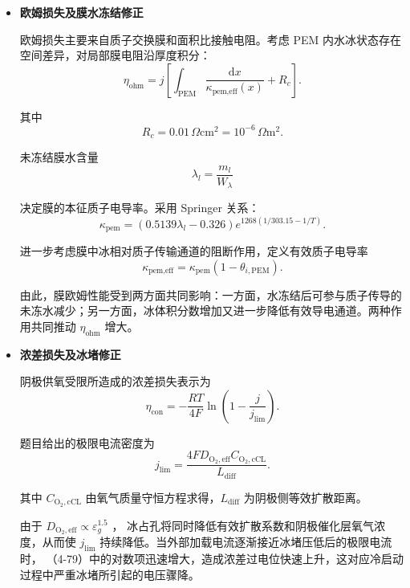 \documentclass[bwprint]{gmcmthesis}
\numberwithin{figure}{section}
\begin{document}
\begin{itemize}
\item \textbf {欧姆损失及膜水冻结修正}

 欧姆损失主要来自质子交换膜和面积比接触电阻。考虑 PEM 内水冰状态存在空间差异，对局部膜电阻沿厚度积分：
\begin{equation}
\eta_{\text{ohm}} = j \left[ \int_{\text{PEM}} \frac{\mathrm{d}x}{\kappa_{\text{pem,eff}}(x)} + R_c \right]. \tag{4-76}
\end{equation}

 其中
\[
R_c = 0.01 \, \Omega\text{cm}^2 = 10^{-6} \, \Omega\text{m}^2.
\]

 未冻结膜水含量
\[
\lambda_l = \frac{m_l}{W_\lambda}
\]

 决定膜的本征质子电导率。采用 Springer 关系：
\begin{equation}
\kappa_{\text{pem}} = (0.5139\lambda_l - 0.326)e^{1268(1/303.15 - 1/T)}. \tag{4-77}
\end{equation}

 进一步考虑膜中冰相对质子传输通道的阻断作用，定义有效质子电导率
\begin{equation}
\kappa_{\text{pem,eff}} = \kappa_{\text{pem}}(1 - \theta_{i,\text{PEM}}). \tag{4-78}
\end{equation}

 由此，膜欧姆性能受到两方面共同影响：一方面，水冻结后可参与质子传导的未冻水减少；另一方面，冰体积分数增加又进一步降低有效导电通道。两种作用共同推动 \(\eta_{\text{ohm}}\) 增大。


\item \textbf {浓差损失及冰堵修正}

 阴极供氧受限所造成的浓差损失表示为
\begin{equation}
\eta_{\text{con}} = -\frac{RT}{4F} \ln \left( 1 - \frac{j}{j_{\text{lim}}} \right). \tag{4-79}
\end{equation}

 题目给出的极限电流密度为
\begin{equation}
j_{\text{lim}} = \frac{4 F D_{\text{O}_2,\text{eff}} C_{\text{O}_2,\text{cCL}}}{L_{\text{diff}}}. \tag{4-80}
\end{equation}

 其中 \(C_{\text{O}_2,\text{cCL}}\) 由氧气质量守恒方程求得，\(L_{\text{diff}}\) 为阴极侧等效扩散距离。

 由于 $D_{\text{O}_2,\text{eff}} \propto \varepsilon_g^{1.5}$ ，
冰占孔将同时降低有效扩散系数和阴极催化层氧气浓度，从而使 \(j_{\text{lim}}\) 持续降低。当外部加载电流逐渐接近冰堵压低后的极限电流时，
（4-79）中的对数项迅速增大，造成浓差过电位快速上升，这对应冷启动过程中严重冰堵所引起的电压骤降。


\end{itemize}
\end{document}
